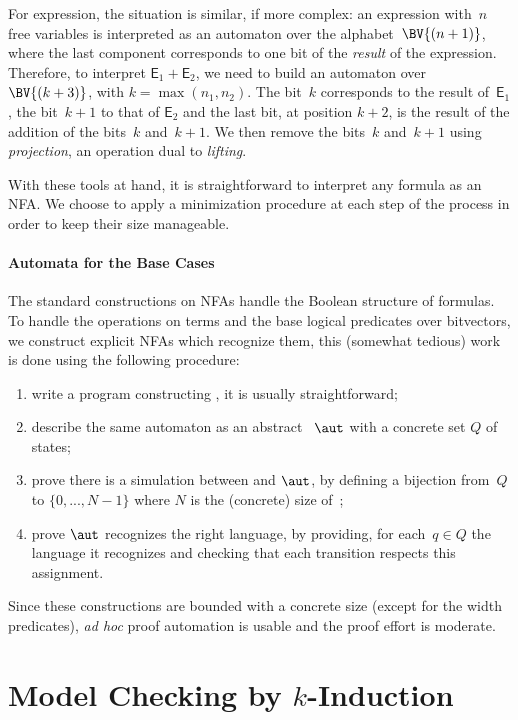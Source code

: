 For expression, the situation is similar, if more complex: an expression
with~$n$ free variables is interpreted as an automaton over the
alphabet~$\BV{(n+1)}$, where the last component corresponds to one bit of the
\emph{result} of the expression.
%
Therefore, to interpret $\mathsf E_1 + \mathsf E_2$, we need to build an
automaton over~$\BV{(k+3)}$, with $k = \max(n_1, n_2)$.
%
The bit~$k$ corresponds to the result of~$\mathsf E_1$, the bit~$k+1$ to that of
$\mathsf E_2$ and the last bit, at position $k+2$, is the result of the addition
of the bits~$k$ and~$k+1$.
%
We then remove the bits~$k$ and~$k+1$ using \emph{projection}, an operation dual
to \emph{lifting}.

With these tools at hand, it is straightforward to interpret any formula as an
NFA. We choose to apply a minimization procedure at each step of the process
in order to keep their size manageable.

\paragraph{Automata for the Base Cases}

The standard constructions on NFAs handle the Boolean structure of formulas.
%
To handle the operations on terms and the base logical predicates over
bitvectors, we construct explicit NFAs which recognize them, this (somewhat
tedious) work is done using the following procedure:
\begin{enumerate}
  \item write a program constructing , it is usually
    straightforward;
  \item describe the same automaton as an abstract ~$\aut$ with
    a concrete set $Q$ of states;
  \item prove there is a simulation between  and $\aut$, by
    defining a bijection from~$Q$ to $\{0, ..., N-1\}$ where $N$ is the
    (concrete) size of~;
  \item prove $\aut$ recognizes the right language, by providing, for each~$q
    \in Q$ the language it recognizes and checking that each transition respects
    this assignment.
\end{enumerate}
%
Since these constructions are bounded with a concrete size (except for the width
predicates), \emph{ad hoc} proof automation is usable and the proof effort is
moderate.

\section{Model Checking by \texorpdfstring{$k$}{k}-Induction}
\label{sec:swbv:kinduction}


